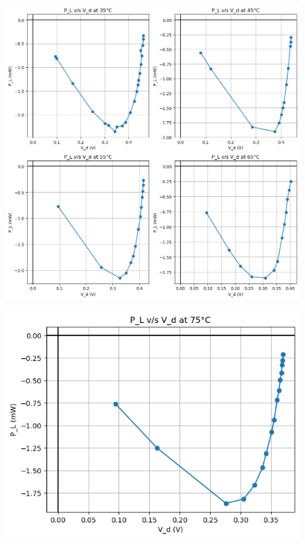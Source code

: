 \documentclass[a4paper]{article}
\begin{document}
\newpage
\begin{figure}[h!]
    \centering
    \includegraphics[width=1\linewidth]{Lab_5/Post_Lab/P_L_vs_V_d_Exp_2_Part_1_Summarised.png}
\end{figure}
\begin{figure}[h!]
    \centering
    \includegraphics[width=0.6\linewidth]{Lab_5/Post_Lab/P_L_vs_V_d_Exp_2_Part_2_Summarised.png}
\end{figure}

\newpage
\end{document}
